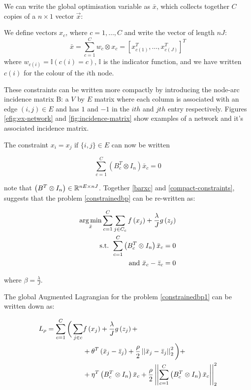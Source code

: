 We can write the global optimisation variable as \(\bar{x}\), which collects together \(C\) copies of a \(n\times 1\) vector \(\vec{x}\):

\begin{definition}
We define vectors \(x_c\), where \(c = 1,\ldots , C\) and write the vector of length \(nJ\):
\begin{equation}
\bar{x} = \sum_{c=1}^C w_c \otimes x_c = \left[x_{c(1)}^T, \ldots	, x_{c(J)}^T\right]^T
\label{barxc}
\end{equation}
where \(w_{c(i)} = \mathbb{I}(c(i) = c)\), \(\mathbb{I}\) is the indicator function, and we have written \(c(i)\) for the colour of the \(i\)th node.
\end{definition}

These constraints can be written more compactly by introducing the node-arc incidence matrix B: a \(V\) by \(E\) matrix where each column is associated with an edge \(\left(i,j\right) \in E\) and has \(1\) and \(-1\) in the \(ith\) and \(jth\) entry respectively. Figures \eqref{efig:ex-network} and \eqref{fig:incidence-matrix} show examples of a network and it's associated incidence matrix.

The constraint \(x_i = x_j \text{ if } \{i,j\} \in E \) can now be written 

\begin{equation}
\sum_{c=1}^C\left(B_c^T \otimes I_n\right)\bar{x}_c = 0
\label{compact-constraints}
\end{equation}

note that \(\left(B^T\otimes I_n \right) \in {\mathbb{R}}^{nE \times nJ}\). Together \eqref{barxc} and \eqref{compact-constraints}, suggests that the problem \eqref{constrainedbp} can be re-written as:

\begin{align}
\operatorname*{arg\,min}_{\bar{x}} \sum_{c=1}^C \sum_{j \in C_c} f\left(x_j\right) + \frac{\lambda}{J} g\left(z_j\right)
\nonumber \\
\text{ s.t. } \sum_{c=1}^C\left(B_c^T \otimes I_n\right)\bar{x}_c = 0 \nonumber \\
\text{ and } \bar{x}_c - \bar{z}_c = 0
\label{constrainedbp1}
\end{align}

where \(\beta = \frac{\lambda}{J}\).

The global Augmented Lagrangian \cite{Boyd2010a}
 for the problem \eqref{constrainedbp1} can be written down as:

\begin{align}
L_\rho = \sum_{c=1}^C  \bigg( \sum_{j \in c} & f\left(x_j\right) + \frac{\lambda}{J} g\left(z_j\right)  + \nonumber \\ & + \theta^T\left(\bar{x}_j - \bar{z}_j\right)  +  \frac{\rho}{2}\left|\left|\bar{x}_j-\bar{z}_j\right|\right|_2^2 \bigg) + \nonumber \\  & + \eta^T\left(B_c^T \otimes I_n\right)\bar{x}_c + \frac{\rho}{2}\left|\left|\sum_{c=1}^C\left(B_c^T \otimes I_n\right)\bar{x}_c\right|\right|_2^2
\label{aug-lagrange}
\end{align}

